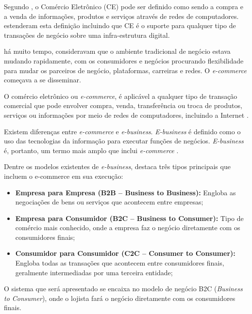 \documentclass[a4paper,12pt]{monografia}
\begin{document}
Segundo , o Comércio Eletrônico (CE) pode ser definido como sendo a compra e a venda de informações, produtos e serviços através de redes de computadores.  estenderam esta definição incluindo que CE é o suporte para qualquer tipo de transações de negócio sobre uma infra-estrutura digital.

 há muito tempo, consideravam que o ambiente tradicional de negócio estava mudando rapidamente, com os consumidores e negócios procurando flexibilidade para mudar os parceiros de negócio, plataformas, carreiras e redes. O \textit{e-commerce} começava a se disseminar.

O comércio eletrônico ou \textit{e-commerce}, é aplicável a qualquer tipo de transação comercial que pode envolver compra, venda, transferência ou troca de produtos, serviços ou informações por meio de redes de computadores, incluindo a Internet \cite{turban}.

Existem diferenças entre \textit{e-commerce} e \textit{e-business}. \textit{E-business} é definido como o uso das tecnologias da informação para executar funções de negócios. \textit{E-business} é, portanto, um termo mais amplo que inclui \textit{e-commerce} \cite{gordon}. 

Dentre os modelos existentes de \textit{e-business},  destaca três tipos principais que incluem o e-commerce em sua execução:

\begin{itemize}
\item \textbf{Empresa para Empresa (B2B – Business to Business):} Engloba as negociações de bens ou serviços que acontecem entre empresas;
\item \textbf{Empresa para Consumidor (B2C – Business to Consumer):} Tipo de comércio mais conhecido, onde a empresa faz o negócio diretamente com os consumidores finais;
\item \textbf{Consumidor para Consumidor (C2C – Consumer to Consumer):} Engloba todas as transações que acontecem entre consumidores finais, geralmente intermediadas por uma terceira entidade;
\end{itemize}

O sistema que será apresentado se encaixa no modelo de negócio B2C (\textit{Business to Consumer}), onde o lojista fará o negócio diretamente com os consumidores finais.


\end{document}
